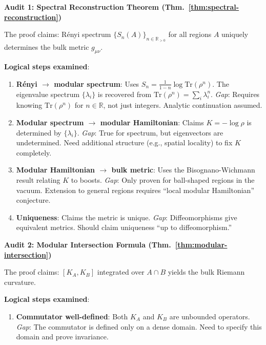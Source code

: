 \documentclass[12pt,a4paper]{article}
\begin{document}
\begin{tcolorbox}[colback=red!5!white, colframe=red!75!black, title=\textbf{RED TEAM Round 4: Proof Audits}]

\textbf{Audit 1: Spectral Reconstruction Theorem (Thm.~\ref{thm:spectral-reconstruction})}

The proof claims: R\'enyi spectrum $\{S_n(A)\}_{n \in \mathbb{R}_{>0}}$ for all regions $A$ uniquely determines the bulk metric $g_{\mu\nu}$.

\textbf{Logical steps examined}:
\begin{enumerate}[label=\textbf{Gap \arabic*:}]
    \item \textbf{R\'enyi $\to$ modular spectrum}: Uses $S_n = \frac{1}{1-n}\log\text{Tr}(\rho^n)$. The eigenvalue spectrum $\{\lambda_i\}$ is recovered from $\text{Tr}(\rho^n) = \sum_i \lambda_i^n$. \emph{Gap}: Requires knowing $\text{Tr}(\rho^n)$ for $n \in \mathbb{R}$, not just integers. Analytic continuation assumed.
    
    \item \textbf{Modular spectrum $\to$ modular Hamiltonian}: Claims $K = -\log\rho$ is determined by $\{\lambda_i\}$. \emph{Gap}: True for spectrum, but eigenvectors are undetermined. Need additional structure (e.g., spatial locality) to fix $K$ completely.
    
    \item \textbf{Modular Hamiltonian $\to$ bulk metric}: Uses the Bisognano-Wichmann result relating $K$ to boosts. \emph{Gap}: Only proven for ball-shaped regions in the vacuum. Extension to general regions requires ``local modular Hamiltonian'' conjecture.
    
    \item \textbf{Uniqueness}: Claims the metric is unique. \emph{Gap}: Diffeomorphisms give equivalent metrics. Should claim uniqueness ``up to diffeomorphism.''
\end{enumerate}

\textbf{Audit 2: Modular Intersection Formula (Thm.~\ref{thm:modular-intersection})}

The proof claims: $[K_A, K_B]$ integrated over $A \cap B$ yields the bulk Riemann curvature.

\textbf{Logical steps examined}:
\begin{enumerate}[label=\textbf{Gap \arabic*:}]
    \item \textbf{Commutator well-defined}: Both $K_A$ and $K_B$ are unbounded operators. \emph{Gap}: The commutator is defined only on a dense domain. Need to specify this domain and prove invariance.
    

\end{enumerate}
\end{tcolorbox}
\end{document}
